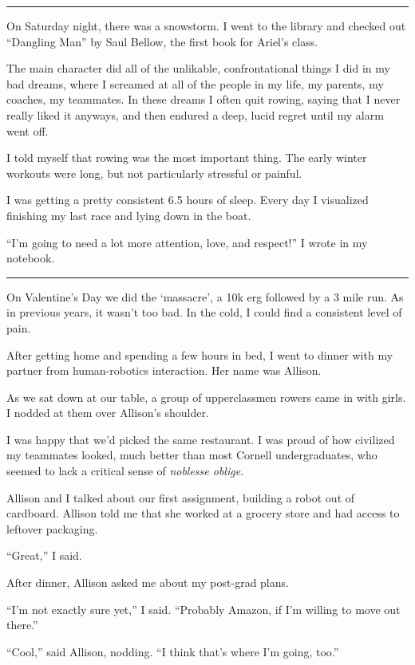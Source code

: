 \plainfancybreak{12pt}{2}{}

On Saturday night, there was a snowstorm.  I went to the library and checked out
``Dangling Man'' by Saul Bellow, the first book for Ariel's class.

The main character did all of the unlikable, confrontational things I did in my
bad dreams, where I screamed at all of the people in my life, my parents, my
coaches, my teammates.  In these dreams I often quit rowing, saying that I never
really liked it anyways, and then endured a deep, lucid regret until my alarm
went off.

I told myself that rowing was the most important thing.  The early winter
workouts were long, but not particularly stressful or painful.  

I was getting a pretty consistent 6.5 hours of sleep.  Every day I visualized
finishing my last race and lying down in the boat.  

``I'm going to need a lot more attention, love, and respect!'' I wrote in my
notebook. 

\plainfancybreak{12pt}{2}{}

On Valentine's Day we did the `massacre', a 10k erg followed by a 3 mile run.
As in previous years, it wasn't too bad.  In the cold, I could find a consistent
level of pain.

After getting home and spending a few hours in bed, I went to dinner with my
partner from human-robotics interaction.  Her name was Allison. 

As we sat down at our table, a group of upperclassmen rowers came in with girls.
I nodded at them over Allison's shoulder.  

I was happy that we'd picked the same restaurant.  I was proud of how civilized
my teammates looked, much better than most Cornell undergraduates, who seemed to
lack a critical sense of \textit{noblesse oblige}.

Allison and I talked about our first assignment, building a robot out of
cardboard.  Allison told me that she worked at a grocery store and had access to
leftover packaging.

``Great,'' I said.

After dinner, Allison asked me about my post-grad plans.  

``I'm not exactly sure yet,'' I said.  ``Probably Amazon, if I'm willing to move
out there.''

``Cool,'' said Allison, nodding.  ``I think that's where I'm going, too.''


